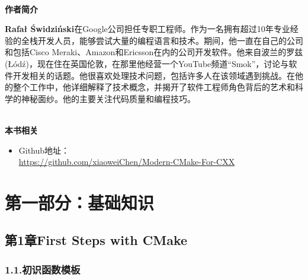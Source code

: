 \documentclass[11pt,a4paper,UTF8]{book}
\begin{document}
\begin{sloppypar}
	\hspace*{\fill} \\ %
	\noindent\textbf{作者简介}
	
	\textbf{Rafał Świdziński}在Google公司担任专职工程师。作为一名拥有超过10年专业经验的全栈开发人员，能够尝试大量的编程语言和技术。期间，他一直在自己的公司和包括Cisco Meraki、Amazon和Ericsson在内的公司开发软件。他来自波兰的罗兹(Łódź)，现在住在英国伦敦，在那里他经营一个YouTube频道“Smok”，讨论与软件开发相关的话题。他很喜欢处理技术问题，包括许多人在该领域遇到挑战。在他的整个工作中，他详细解释了技术概念，并揭开了软件工程师角色背后的艺术和科学的神秘面纱。他的主要关注代码质量和编程技巧。
	
	\hspace*{\fill} \\ %
	\noindent\textbf{本书相关}
	\begin{itemize}
		\item Github地址：\\\url{https://github.com/xiaoweiChen/Modern-CMake-For-CXX}
	\end{itemize}
	\newpage
	
	\pagestyle{empty}
	
	\newpage
	
	\tableofcontents
	\newpage

	
	\color{white}
	\section*{第一部分：基础知识}
	\pagecolor{mygray}
	\textbf{}
	\newpage
	\color{black}
	\pagecolor{white}

	\subsection*{ 第1章\hspace{0.5cm}First Steps with CMake}
	
	\subsubsection*{ 1.1.\hspace{0.2cm}初识函数模板}
	

\end{sloppypar}
\end{document}
